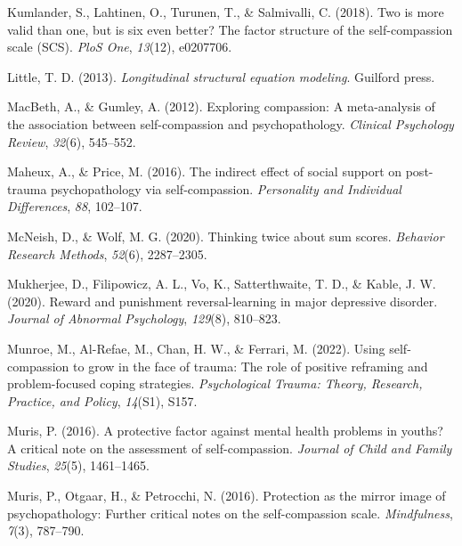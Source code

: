 \documentclass[
  man]{apa7}
\newlength{\cslhangindent}
\newlength{\cslentryspacingunit} %
\newenvironment{CSLReferences}[2] %
 {%
  \setlength{\parindent}{0pt}
  \ifodd #1
  \let\oldpar\par
  \def\par{\hangindent=\cslhangindent\oldpar}
  \fi
  \setlength{\parskip}{#2\cslentryspacingunit}
 }%
 {}
\begin{document}
\begin{CSLReferences}{1}{0}
\leavevmode{}%
Kumlander, S., Lahtinen, O., Turunen, T., \& Salmivalli, C. (2018). Two is more valid than one, but is six even better? The factor structure of the self-compassion scale (SCS). \emph{PloS One}, \emph{13}(12), e0207706.

\leavevmode{}%
Little, T. D. (2013). \emph{Longitudinal structural equation modeling}. Guilford press.

\leavevmode{}%
MacBeth, A., \& Gumley, A. (2012). Exploring compassion: A meta-analysis of the association between self-compassion and psychopathology. \emph{Clinical Psychology Review}, \emph{32}(6), 545--552.

\leavevmode{}%
Maheux, A., \& Price, M. (2016). The indirect effect of social support on post-trauma psychopathology via self-compassion. \emph{Personality and Individual Differences}, \emph{88}, 102--107.

\leavevmode{}%
McNeish, D., \& Wolf, M. G. (2020). Thinking twice about sum scores. \emph{Behavior Research Methods}, \emph{52}(6), 2287--2305.

\leavevmode{}%
Mukherjee, D., Filipowicz, A. L., Vo, K., Satterthwaite, T. D., \& Kable, J. W. (2020). Reward and punishment reversal-learning in major depressive disorder. \emph{Journal of Abnormal Psychology}, \emph{129}(8), 810--823.

\leavevmode{}%
Munroe, M., Al-Refae, M., Chan, H. W., \& Ferrari, M. (2022). Using self-compassion to grow in the face of trauma: The role of positive reframing and problem-focused coping strategies. \emph{Psychological Trauma: Theory, Research, Practice, and Policy}, \emph{14}(S1), S157.

\leavevmode{}%
Muris, P. (2016). A protective factor against mental health problems in youths? A critical note on the assessment of self-compassion. \emph{Journal of Child and Family Studies}, \emph{25}(5), 1461--1465.

\leavevmode{}%
Muris, P., Otgaar, H., \& Petrocchi, N. (2016). Protection as the mirror image of psychopathology: Further critical notes on the self-compassion scale. \emph{Mindfulness}, \emph{7}(3), 787--790.


\end{CSLReferences}
\end{document}
